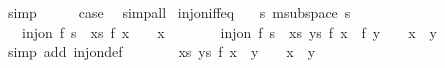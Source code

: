 \begin{isabellebody}
\ simp\isanewline
\ \ \isamarkupfalse%
\ \isamarkupfalse%
\ {\isacharquery}{\kern0pt}case\ \isacommand{{\isachardot}{\kern0pt}}\isamarkupfalse%
\isanewline
{}\isamarkupfalse%
\ simp{\isacharunderscore}{\kern0pt}all%
\endisatagproof
{\isafoldproof}%
%
\isadelimproof
\isanewline
%
\endisadelimproof
\isanewline
{}\isamarkupfalse%
\ inj{\isacharunderscore}{\kern0pt}on{\isacharunderscore}{\kern0pt}iff{\isacharunderscore}{\kern0pt}eq{\isacharunderscore}{\kern0pt}{}{\isacharcolon}{\kern0pt}\isanewline
\ \ \ s{\isacharcolon}{\kern0pt}\ {\isachardoublequoteopen}m{}{\isachardot}{\kern0pt}subspace\ s{\isachardoublequoteclose}\isanewline
\ \ \ {\isachardoublequoteopen}inj{\isacharunderscore}{\kern0pt}on\ f\ s\ {\isasymlongleftrightarrow}\ {\isacharparenleft}{\kern0pt}{\isasymforall}x{\isasymin}s{\isachardot}{\kern0pt}\ f\ x\ {\isacharequal}{\kern0pt}\ {}\ {\isasymlongrightarrow}\ x\ {\isacharequal}{\kern0pt}\ {}{\isacharparenright}{\kern0pt}{\isachardoublequoteclose}\isanewline
%
\isadelimproof
%
\endisadelimproof
%
\isatagproof
{}\isamarkupfalse%
\ {\isacharminus}{\kern0pt}\isanewline
\ \ \isamarkupfalse%
\ {\isachardoublequoteopen}inj{\isacharunderscore}{\kern0pt}on\ f\ s\ {\isasymlongleftrightarrow}\ {\isacharparenleft}{\kern0pt}{\isasymforall}x{\isasymin}s{\isachardot}{\kern0pt}\ {\isasymforall}y{\isasymin}s{\isachardot}{\kern0pt}\ f\ x\ {\isacharminus}{\kern0pt}\ f\ y\ {\isacharequal}{\kern0pt}\ {}\ {\isasymlongrightarrow}\ x\ {\isacharminus}{\kern0pt}\ y\ {\isacharequal}{\kern0pt}\ {}{\isacharparenright}{\kern0pt}{\isachardoublequoteclose}\isanewline
\ \ \ \ \isamarkupfalse%
\ {\isacharparenleft}{\kern0pt}simp\ add{\isacharcolon}{\kern0pt}\ inj{\isacharunderscore}{\kern0pt}on{\isacharunderscore}{\kern0pt}def{\isacharparenright}{\kern0pt}\isanewline
\ \ \isamarkupfalse%
\ \isamarkupfalse%
\ {\isachardoublequoteopen}{\isasymdots}\ {\isasymlongleftrightarrow}\ {\isacharparenleft}{\kern0pt}{\isasymforall}x{\isasymin}s{\isachardot}{\kern0pt}\ {\isasymforall}y{\isasymin}s{\isachardot}{\kern0pt}\ f\ {\isacharparenleft}{\kern0pt}x\ {\isacharminus}{\kern0pt}\ y{\isacharparenright}{\kern0pt}\ {\isacharequal}{\kern0pt}\ {}\ {\isasymlongrightarrow}\ x\ {\isacharminus}{\kern0pt}\ y\ {\isacharequal}{\kern0pt}\ {}{\isacharparenright}{\kern0pt}{\isachardoublequoteclose}\isanewline
\ \ \ \ \isamarkupfalse%

\end{isabellebody}
